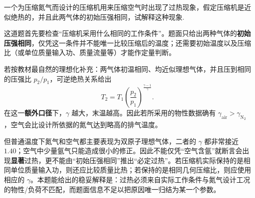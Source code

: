 \begin{exercise}\label{ex:11.14}
一个为压缩氮气而设计的压缩机用来压缩空气时出现了过热现象，假定压缩机是近似绝热的，并且此两气体的初始压强相同，试解释这种现象.
\end{exercise}
\begin{solution}
这道题首先要检查“压缩机采用什么相同的工作条件”。题面只给出两种气体的\textbf{初始压强相同}，仅凭这一条件并不能唯一比较压缩后的温度；还需要初始温度以及压缩比（或单位质量输入功、质量流量等）才能作定量判断。

若按教材最自然的理想化补充：两气体初温相同、均近似理想气体，并且压到相同的压强比 $p_2/p_1$，可逆绝热关系给出
$$ T_2 = T_1 \left( \frac{p_2}{p_1} \right)^{\frac{\gamma - 1}{\gamma}}. $$
在这一\textbf{额外口径}下，$\gamma$ 越大，末温越高。因此若所采用的物性数据确有 $\gamma_{\mathrm{air}}>\gamma_{\mathrm{N_2}}$，空气会比设计所依据的氮气达到略高的排气温度。

但普通温度下氮气和空气都主要表现为双原子理想气体，二者的 $\gamma$ 都非常接近 $1.40$；空气中少量氩气只能造成很小的修正。因此不能仅凭“空气含氩”就断言会出现\textbf{显著}过热，更不能由“初始压强相同”推出“必定过热”。若压缩机实际保持的是相同单位质量输入功，则还应比较质量比热；若保持的是相同几何压缩比，则应使用相应的 $\gamma$。本题能给出的稳妥解释是：过热必须来自实际工作条件与氮气设计工况的物性/负荷不匹配，而题面信息不足以把原因唯一归结为某一个参数。
\end{solution}

